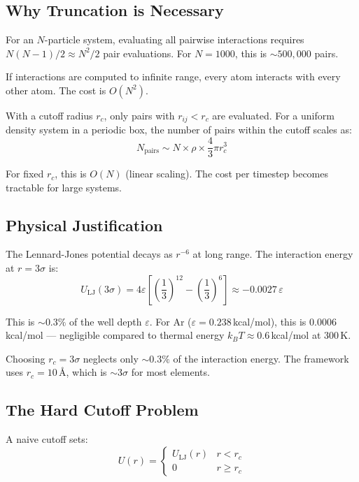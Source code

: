 \documentclass[11pt]{article}
\begin{document}
\subsection{Why Truncation is Necessary}

For an $N$-particle system, evaluating all pairwise interactions requires $N(N-1)/2 \approx N^2/2$ pair evaluations. For $N = 1000$, this is $\sim 500{,}000$ pairs.

If interactions are computed to infinite range, every atom interacts with every other atom. The cost is $O(N^2)$.

With a cutoff radius $r_c$, only pairs with $r_{ij} < r_c$ are evaluated. For a uniform density system in a periodic box, the number of pairs within the cutoff scales as:
\begin{equation}
N_{\text{pairs}} \sim N \times \rho \times \frac{4}{3}\pi r_c^3
\end{equation}

For fixed $r_c$, this is $O(N)$ (linear scaling). The cost per timestep becomes tractable for large systems.

\subsection{Physical Justification}

The Lennard-Jones potential decays as $r^{-6}$ at long range. The interaction energy at $r = 3\sigma$ is:
\begin{equation}
U_{\text{LJ}}(3\sigma) = 4\varepsilon \left[\left(\frac{1}{3}\right)^{12} - \left(\frac{1}{3}\right)^6\right] \approx -0.0027\,\varepsilon
\end{equation}

This is $\sim 0.3\%$ of the well depth $\varepsilon$. For Ar ($\varepsilon = 0.238$\,kcal/mol), this is $0.0006$\,kcal/mol — negligible compared to thermal energy $k_B T \approx 0.6$\,kcal/mol at 300\,K.

Choosing $r_c = 3\sigma$ neglects only $\sim 0.3\%$ of the interaction energy. The framework uses $r_c = 10$\,\AA, which is $\sim 3\sigma$ for most elements.

\subsection{The Hard Cutoff Problem}

A naive cutoff sets:
\begin{equation}
U(r) = \begin{cases}
U_{\text{LJ}}(r) & r < r_c \\
0 & r \geq r_c
\end{cases}
\end{equation}
\end{document}
